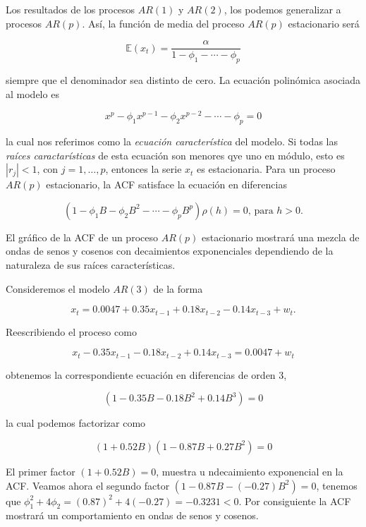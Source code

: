 \documentclass[12pt,]{krantz}
\theoremstyle{definition}
\theoremstyle{definition}
\theoremstyle{definition}
\theoremstyle{remark}
\let\BeginKnitrBlock\begin \let\EndKnitrBlock\end
\begin{document}
Los resultados de los procesos \(AR(1)\) y \(AR(2)\), los podemos
generalizar a procesos \(AR(p)\). Así, la función de media del proceso
\(AR(p)\) estacionario será

\begin{equation}
\mathbb{E}(x_t) = \frac{\alpha}{1-\phi_1-\cdots-\phi_p}
\label{eq:eq-funcion-media-ARp}
\end{equation}

siempre que el denominador sea distinto de cero. La ecuación polinómica
asociada al modelo es

\begin{equation}
x^p-\phi_1x^{p-1}-\phi_2x^{p-2}-\cdots-\phi_p=0
\label{eq:eq-polinomio-ARp}
\end{equation}

la cual nos referimos como la \emph{ecuación característica} del modelo.
Si todas las \emph{raíces caractarísticas} de esta ecuación son menores
qye uno en módulo, esto es \(|r_j|<1\), con \(j=1,\ldots,p\), entonces
la serie \(x_t\) es estacionaria. Para un proceso \(AR(p)\)
estacionario, la ACF satisface la ecuación en diferencias

\[(1-\phi_1B-\phi_2B^2-\cdots-\phi_pB^p)\rho(h)=0\text{, para }h>0.\]

El gráfico de la ACF de un proceso \(AR(p)\) estacionario mostrará una
mezcla de ondas de senos y cosenos con decaimientos exponenciales
dependiendo de la naturaleza de sus raíces características.

\BeginKnitrBlock{example}
\protect\hypertarget{exm:ejem-modelo-AR3}{}{\label{exm:ejem-modelo-AR3}
}Consideremos el modelo \(AR(3)\) de la forma

\[x_t=0.0047+0.35x_{t-1}+0.18x_{t-2}-0.14x_{t-3}+w_t.\]

Reescribiendo el proceso como

\[x_t-0.35x_{t-1}-0.18x_{t-2}+0.14x_{t-3}=0.0047+w_t\]

obtenemos la correspondiente ecuación en diferencias de orden 3,

\[(1-0.35B-0.18B^2+0.14B^3)=0\]

la cual podemos factorizar como

\[(1+0.52B)(1-0.87B+0.27B^2)=0\]

El primer factor \((1+0.52B)=0\), muestra u ndecaimiento exponencial en
la ACF. Veamos ahora el segundo factor \((1-0.87B-(-0.27)B^2)=0\),
tenemos que \(\phi_1^2+4\phi_2=(0.87)^2+4(-0.27)=-0.3231<0\). Por
consiguiente la ACF mostrará un comportamiento en ondas de senos y
cosenos.
\EndKnitrBlock{example}
\end{document}
